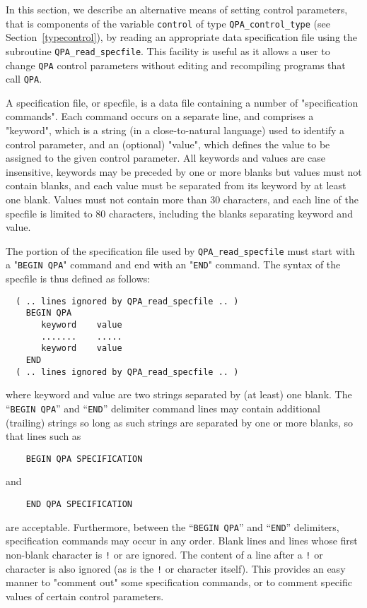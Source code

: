 \documentclass{galahad}
\newcommand{\packagename}{QPA}
\begin{document}

\galfeatures
\noindent In this section, we describe an alternative means of setting 
control parameters, that is components of the variable {\tt control} of type
{\tt \packagename\_control\_type}
(see Section~\ref{typecontrol}), 
by reading an appropriate data specification file using the
subroutine {\tt \packagename\_read\_specfile}. This facility
is useful as it allows a user to change  {\tt \packagename} control parameters 
without editing and recompiling programs that call {\tt \packagename}.

A specification file, or specfile, is a data file containing a number of 
"specification commands". Each command occurs on a separate line, 
and comprises a "keyword", 
which is a string (in a close-to-natural language) used to identify a 
control parameter, and 
an (optional) "value", which defines the value to be assigned to the given
control parameter. All keywords and values are case insensitive, 
keywords may be preceded by one or more blanks but
values must not contain blanks, and
each value must be separated from its keyword by at least one blank.
Values must not contain more than 30 characters, and 
each line of the specfile is limited to 80 characters,
including the blanks separating keyword and value.

The portion of the specification file used by 
{\tt \packagename\_read\_specfile}
must start
with a "{\tt BEGIN \packagename}" command and end with an 
"{\tt END}" command.  The syntax of the specfile is thus defined as follows:
\begin{verbatim}
  ( .. lines ignored by QPA_read_specfile .. )
    BEGIN QPA
       keyword    value
       .......    .....
       keyword    value
    END 
  ( .. lines ignored by QPA_read_specfile .. )
\end{verbatim}
where keyword and value are two strings separated by (at least) one blank.
The ``{\tt BEGIN \packagename}'' and ``{\tt END}'' delimiter command lines 
may contain additional (trailing) strings so long as such strings are 
separated by one or more blanks, so that lines such as
\begin{verbatim}
    BEGIN QPA SPECIFICATION
\end{verbatim}
and
\begin{verbatim}
    END QPA SPECIFICATION
\end{verbatim}
are acceptable. Furthermore, 
between the
``{\tt BEGIN \packagename}'' and ``{\tt END}'' delimiters,
specification commands may occur in any order.  Blank lines and
lines whose first non-blank character is {\tt !} or {\tt *} are ignored. 
The content 
of a line after a {\tt !} or {\tt *} character is also 
ignored (as is the {\tt !} or {\tt *}
character itself). This provides an easy manner to "comment out" some 
specification commands, or to comment specific values 
of certain control parameters.  
\end{document}
